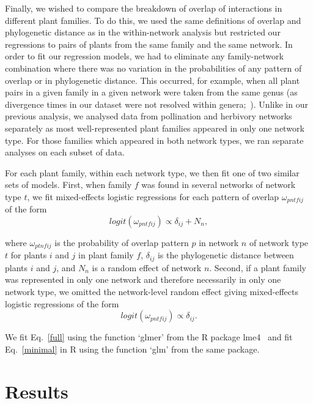 \documentclass[12pt]{article}
\begin{document}
\begin{spacing}{1.5}
  Finally, we wished to compare the breakdown of overlap of interactions in
  different plant families. To do this, we used the same definitions of overlap
  and phylogenetic distance as in the within-network analysis but restricted
  our regressions to pairs of plants from the same family and the same network.
  In order to fit our regression models, we had to eliminate any family-network
  combination where there was no variation in the probabilities of any pattern of
  overlap or in phylogenetic distance.  This occurred, for example, when all 
  plant pairs in a given family in a given network were taken from the same genus
  (as divergence times in our dataset were not resolved within genera;~\citealp{Wikstrom2001}).
  Unlike in our previous analysis, we analysed data from pollination and
  herbivory networks separately as most well-represented plant families appeared
  in only one network type. For those families which appeared in both network types, 
  we ran separate analyses on each subset of data.


  For each plant family, within each network type, we then fit one of two similar 
  sets of models. First, when family $f$ was found in several networks of network
  type $t$, we fit mixed-effects logistic regressions for each pattern of overlap $\omega_{pntfij}$ of the form
  \begin{equation}
    logit(\omega_{pntfij}) \propto \delta_{ij} + N_{n} ,
    \label{full}
  \end{equation}

  \noindent where $\omega_{ptnfij}$ is the probability of overlap pattern $p$
  in network $n$ of network type $t$ for plants $i$ and $j$ in plant family $f$,
  $\delta_{ij}$ is the phylogenetic distance between plants $i$ and $j$, and
  $N_{n}$ is a random effect of network $n$.
  Second, if a plant family was represented in only one network 
  and therefore necessarily in only one network type, we omitted the 
  network-level random effect giving mixed-effects logistic regressions of the form
 \begin{equation}
    logit(\omega_{pntfij}) \propto \delta_{ij} .
    \label{minimal}
  \end{equation}

  \noindent We fit Eq.~\ref{full} using the function `glmer' from the
  R package lme4~\citep{lme4} and fit Eq.~\ref{minimal} in R using the
  function `glm' from the same package.


\section*{Results}



\end{spacing}
\end{document}
